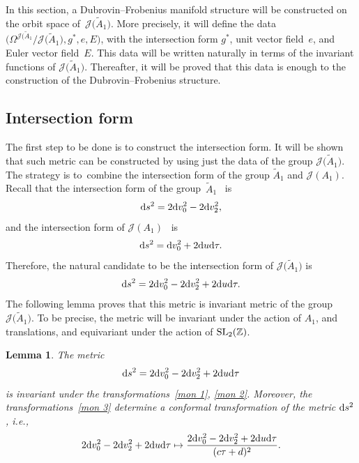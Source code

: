 \documentclass[10pt,a4paper]{amsart}
\numberwithin{equation}{section}
\newtheorem{Lemma}[Theorem]{Lemma}
\newcommand{\Ja}{\mathcal{J}}
\begin{document}
In this section, a Dubrovin--Frobenius manifold structure will be constructed on the orbit space of~$\Ja\big(\tilde A_1\big)$. More precisely, it will define the data $\big(\Omega^{\Ja(\tilde A_1}/\Ja\big(\tilde A_1\big),g^{*},e,E\big)$, with the intersection form $g^*$, unit vector field~$e$, and Euler vector field~$E$. This data will be written naturally in terms of the invariant functions of $\Ja\big(\tilde A_1\big)$. Thereafter, it will be proved that this data is enough to the construction of the Dubrovin--Frobenius structure.


\subsection{Intersection form}

The first step to be done is to construct the intersection form. It will be shown that such metric can be constructed by using just the data of the group $\Ja\big(\tilde A_1\big)$. The strategy is to~combine the intersection form of the group $\tilde A_1$ and $\Ja(A_1)$. Recall that the intersection form of the group~$\tilde A_1$~\cite{B.Dubrovin2, B.DubrovinandY.Zhang} is
\begin{gather*}
{\rm d}s^2=2{\rm d}v_0^2-2{\rm d}v_2^2,
\end{gather*}
and the intersection form of $\Ja(A_1)$~\cite{BertolaM.1, BertolaM.2, B.Dubrovin2} is
\begin{gather*}
{\rm d}s^2={\rm d}v_0^2+2{\rm d}u {\rm d}\tau.
\end{gather*}
Therefore, the natural candidate to be the intersection form of $\Ja\big(\tilde A_1\big)$ is
\begin{gather*}
{\rm d}s^2=2{\rm d}v_0^2-2{\rm d}v_2^2+2{\rm d}u {\rm d}\tau.
\end{gather*}
The following lemma proves that this metric is invariant metric of the group $\Ja\big(\tilde A_1\big)$. To be precise, the metric will be invariant under the action of $A_1$, and translations, and equivariant under the action of ${\rm SL}_2(\mathbb{Z})$.

\begin{Lemma}
The metric
\begin{gather}\label{metrich100}
{\rm d}s^2=2{\rm d}v_0^2-2{\rm d}v_2^2+2{\rm d}u {\rm d}\tau
\end{gather}
is invariant under the transformations~\eqref{mon 1}, \eqref{mon 2}.
Moreover, the transformations~\eqref{mon 3} deter\-mine a conformal transformation of the metric ${\rm d}s^2$, i.e.,
\begin{gather*}
2{\rm d}v_0^2-2{\rm d}v_2^2+2{\rm d}u {\rm d}\tau\mapsto \frac{2{\rm d}v_0^2-2{\rm d}v_2^2+2{\rm d}u {\rm d}\tau}{(c\tau+d)^2}.
\end{gather*}
\end{Lemma}
\end{document}
